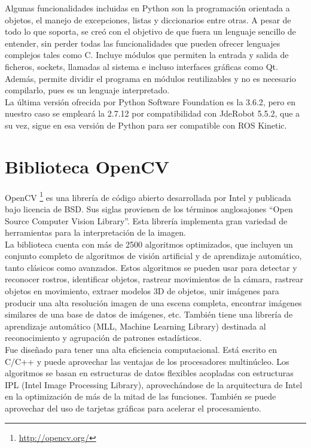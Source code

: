 Algunas funcionalidades incluidas en Python son la programación orientada a objetos, el manejo de excepciones, listas y diccionarios entre otras. A pesar de todo lo que soporta, se creó con el objetivo de que fuera un lenguaje sencillo de entender, sin perder todas las funcionalidades que pueden ofrecer lenguajes complejos tales como C. Incluye módulos que permiten la entrada y salida de ficheros, sockets, llamadas al sistema e incluso interfaces gráficas como Qt. Además, permite dividir el programa en módulos reutilizables y no es necesario compilarlo, pues es un lenguaje interpretado. \\

La última versión ofrecida por Python Software Foundation es la 3.6.2, pero en nuestro caso se empleará la 2.7.12 por compatibilidad con JdeRobot 5.5.2, que a su vez, sigue en esa versión de Python para ser compatible con ROS Kinetic.


\section{Biblioteca OpenCV}
OpenCV \footnote{\url{http://opencv.org/}} es una librería de código abierto desarrollada por Intel y publicada bajo licencia de BSD. Sus siglas provienen de los términos anglosajones ``Open Source Computer Vision Library''. Esta librería implementa gran variedad de herramientas para la interpretación de la imagen.\\

La biblioteca cuenta con más de 2500 algoritmos optimizados, que incluyen un conjunto completo de algoritmos de visión artificial y de aprendizaje automático, tanto clásicos como avanzados. Estos algoritmos se pueden usar para detectar y reconocer rostros, identificar objetos, rastrear movimientos de la cámara, rastrear objetos en movimiento, extraer modelos 3D de objetos, unir imágenes para producir una alta resolución imagen de una escena completa, encontrar imágenes similares de una base de datos de imágenes, etc. También tiene una librería de aprendizaje automático (MLL, Machine Learning Library) destinada al reconocimiento y agrupación de patrones estadísticos. \\

Fue diseñado para tener una alta eficiencia computacional. Está escrito en C/C++ y puede aprovechar las ventajas de los procesadores multinúcleo. Los algoritmos se basan en estructuras de datos flexibles acopladas con estructuras IPL (Intel Image Processing Library), aprovechándose de la arquitectura de Intel en la optimización de más de la mitad de las funciones. También se puede aprovechar del uso de tarjetas gráficas para acelerar el procesamiento.\\

